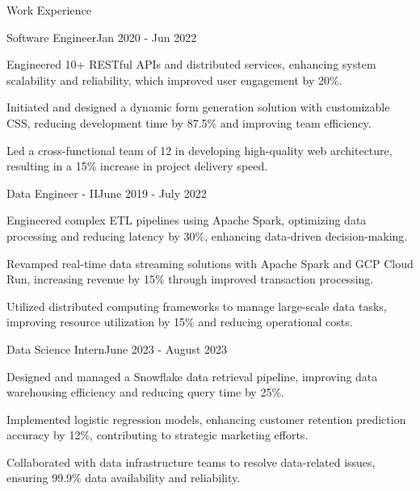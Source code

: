 \documentclass{resume} %
\begin{document}
    \begin{rSection}{Work Experience}
                    \begin{rSubsection}
                {Software Engineer}{Jan 2020 - Jun 2022}
                                    {}
                                {}
                                    \item Engineered 10+ RESTful APIs and distributed services, enhancing system scalability and reliability, which improved user engagement by 20\%.
                                    \item Initiated and designed a dynamic form generation solution with customizable CSS, reducing development time by 87.5\% and improving team efficiency.
                                    \item Led a cross{-}functional team of 12 in developing high{-}quality web architecture, resulting in a 15\% increase in project delivery speed.
                            \end{rSubsection}
                    \begin{rSubsection}
                {Data Engineer {-} II}{June 2019 - July 2022}
                                    {}
                                {}
                                    \item Engineered complex ETL pipelines using Apache Spark, optimizing data processing and reducing latency by 30\%, enhancing data{-}driven decision{-}making.
                                    \item Revamped real{-}time data streaming solutions with Apache Spark and GCP Cloud Run, increasing revenue by 15\% through improved transaction processing.
                                    \item Utilized distributed computing frameworks to manage large{-}scale data tasks, improving resource utilization by 15\% and reducing operational costs.
                            \end{rSubsection}
                    \begin{rSubsection}
                {Data Science Intern}{June 2023 - August 2023}
                                    {}
                                {}
                                    \item Designed and managed a Snowflake data retrieval pipeline, improving data warehousing efficiency and reducing query time by 25\%.
                                    \item Implemented logistic regression models, enhancing customer retention prediction accuracy by 12\%, contributing to strategic marketing efforts.
                                    \item Collaborated with data infrastructure teams to resolve data{-}related issues, ensuring 99.9\% data availability and reliability.
                            \end{rSubsection}
            \end{rSection}
\end{document}
